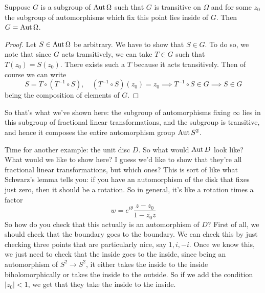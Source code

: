 \documentclass{article}
\begin{document}
\begin{lemma}
Suppose \(G\) is a subgroup of \(\operatorname{Aut}\Omega\) such that \(G\) is transitive on \(\Omega\) and for some \(z_0\) the subgroup of automorphisms which fix this point lies inside of \(G\). Then \(G = \operatorname{Aut}\Omega\).
\end{lemma}
\begin{proof}
Let \(S \in \operatorname{Aut}\Omega\) be arbitrary. We have to show that \(S \in G\). To do so, we note that since \(G\) acts transitively, we can take \(T \in G\) such that \(T(z_0) = S(z_0)\). There exists such a \(T\) because it acts transitively. Then of course we can write
\begin{equation}S = T \circ (T^{-1} \circ S), \quad (T^{-1} \circ S)(z_0) = z_0 \implies T^{-1} \circ S \in G \implies S \in G\end{equation}
being the composition of elements of \(G\).
\end{proof}
So that's what we've shown here: the subgroup of automorphisms fixing \(\infty\) lies in this subgroup of fractional linear transformations, and the subgroup is transitive, and hence it composes the entire automorphism group \(\operatorname{Aut} S^2\).

Time for another example: the unit disc \(D\). So what would \(\operatorname{Aut} D\) look like? What would we like to show here? I guess we'd like to show that they're all fractional linear transformations, but which ones? This is sort of like what Schwarz's lemma tells you: if you have an automorphism of the disk that fixes just zero, then it should be a rotation. So in general, it's like a rotation times a factor
\begin{equation}w = e^{i\theta}\frac{z - z_0}{1 - \bar{z_0}z}\end{equation}
So how do you check that this actually is an automorphism of \(D\)? First of all, we should check that the boundary goes to the boundary. We can check this by just checking three points that are particularly nice, say \(1, i, -i\). Once we know this, we just need to check that the inside goes to the inside, since being an automorphism of \(S^2 \to S^2\), it either takes the inside to the inside biholomorphically or takes the inside to the outside. So if we add the condition \(|z_0| < 1\), we get that they take the inside to the inside.
\end{document}

